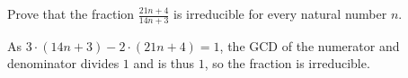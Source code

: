 \begin{problem}
    Prove that the fraction \( \frac{21n+4}{14n+3} \) is irreducible for every natural number \( n \).
\end{problem}
\begin{solution}
    As \( 3 \cdot \left(14n+3\right) - 2 \cdot \left(21n + 4\right) = 1 \), the GCD of the numerator and denominator divides \( 1 \) and is thus \( 1 \), so the fraction is irreducible.
\end{solution}
